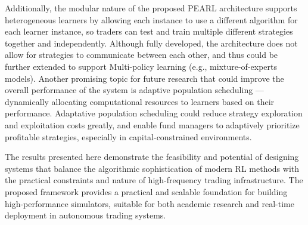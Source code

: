 Additionally, the modular nature of the proposed PEARL architecture supports heterogeneous learners by allowing each instance to use a different algorithm
for each learner instance, so traders can test and train multiple different strategies together and independently.
Although fully developed, the architecture does not allow for strategies to communicate between each other,
and thus could be further extended to support Multi-policy learning (e.g., mixture-of-experts models).
Another promising topic for future research that could improve the overall performance of the system is adaptive population scheduling
—dynamically allocating computational resources to learners based on their performance.
Adaptative population scheduling could reduce strategy exploration and exploitation costs greatly,
and enable fund managers to adaptively prioritize profitable strategies, especially in capital-constrained environments.

The results presented here demonstrate the feasibility and potential of designing systems that balance the algorithmic sophistication of
modern RL methods with the practical constraints and nature of high-frequency trading infrastructure.
The proposed framework provides a practical and scalable foundation for building high-performance simulators,
suitable for both academic research and real-time deployment in autonomous trading systems.
